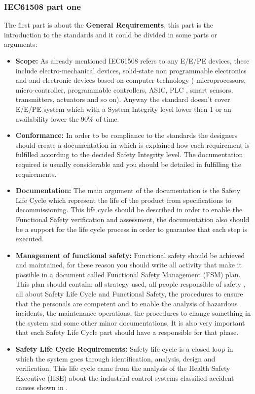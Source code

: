 {{{		    \subsubsection{IEC61508 part one} {
		    The first part is about the \textbf{General Requirements}, this part is the introduction to the standards and it could be divided in some parts or arguments:
		    \begin{itemize}
		        \item \textbf{Scope:} As already mentioned IEC61508 refers to any E/E/PE devices, these include electro-mechanical devices, solid-state non programmable electronics and and electronic devices based on computer technology ( microprocessors, micro-controller, programmable controllers, ASIC, PLC , smart sensors, transmitters, actuators and so on). 
		        Anyway the standard doesn't cover E/E/PE system which with a System Integrity level lower then 1 or an availability lower the 90\% of time.
		        \item \textbf{Conformance:} In order to be compliance to the standards the designers should create a documentation in which is explained how each requirement is fulfilled according to the decided Safety Integrity level. The documentation required is usually considerable and you should be detailed in fulfilling the requirements.
		        \item \textbf{Documentation: } The main argument of the documentation is the Safety Life Cycle which represent the life of the product from specifications to decommissioning. This life cycle should be described in order to enable the Functional Safety verification and assessment, the documentation also should be a support for the life cycle process in order to guarantee that each step is executed.
		        \item \textbf{Management of functional safety: } Functional safety should be achieved and maintained, for these reason you should write all activity that make it possible in a document called Functional Safety Management (FSM) plan. This plan should contain: all strategy used, all people responsible of safety , all about Safety Life Cycle and Functional Safety, the procedures to ensure that the personals are competent and to enable the analysis of hazardous incidents, the maintenance operations, the procedures to change something in the system and some other minor documentations. 
		        It is also very important that each Safety Life Cycle part should have a responsible for that phase.
		        \item \textbf{Safety Life Cycle Requirements: } Safety life cycle is a closed loop in which the system goes through identification, analysis, design and verification. This life cycle came from the analysis of the Health Safety Executive (HSE) about the industrial control systems classified accident causes shown in .
		        

\end{itemize}}}}}
